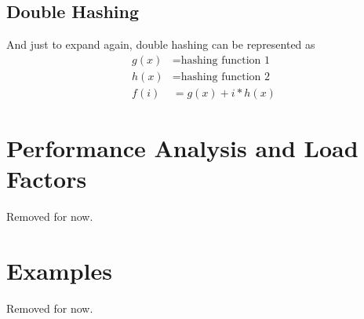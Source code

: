 \documentclass[11pt]{book}
\begin{document}
	\subsection{Double Hashing}
		And just to expand again, double hashing can be represented as
		\begin{align*}
			g(x) &= \text{hashing function 1} \\
			h(x) &= \text{hashing function 2} \\
			f(i) &= g(x) + i * h(x)
		\end{align*}

	\section{Performance Analysis and Load Factors}
		Removed for now.

	\section{Examples}
		Removed for now.
\end{document}

